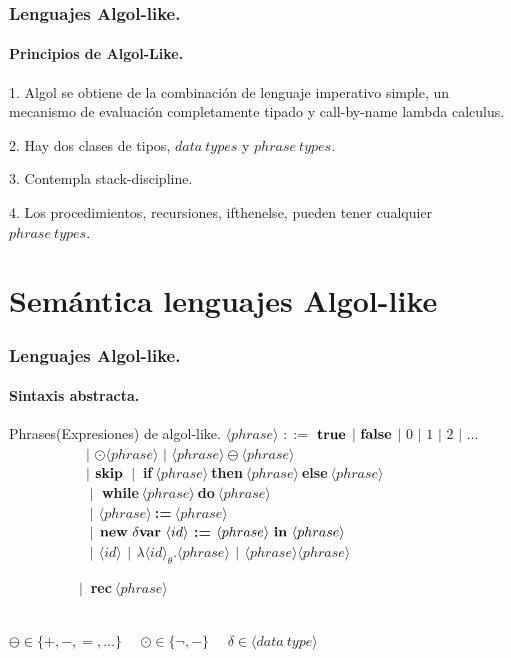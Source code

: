 \documentclass{beamer} %
\newcommand{\angles}[1]{\langle #1 \rangle}
\newcommand{\deltavar}{\delta \bf{var}}
\newcommand{\cskip}{$\bf{skip}$}
\newcommand{\ifthenelse}[3]{\ $\bf{if}$ \ #1 \ $\bf{then}$ \ #2 \ $\bf{else}$ \ #3}
\newcommand{\whiledo}[2]{\ $\bf{while}$ \ #1 \ $\bf{do}$ \ #2}
\newcommand{\rec}[1]{\ $\bf{rec}$ \ #1}
\newcommand{\clambda}[3]{\lambda #1_{#2} . #3}
\newcommand{\assig}[2]{#1 \ ${\bf :=}$ \ #2}
\newcommand{\newdeltavar}[3]{{\bf new \ \deltavar} \ #1 \ ${\bf :=}$ \ #2 \ {\bf in} \ #3}
\begin{document}
\begin{frame}
\frametitle{Lenguajes Algol-like.}
\framesubtitle{Principios de Algol-Like.}
\begin{block}{}
1. Algol se obtiene de la combinaci\'on de lenguaje imperativo simple, un mecanismo de evaluaci\'on completamente tipado y
call-by-name lambda calculus.\\
\end{block}
\begin{block}{}
2. Hay dos clases de tipos, $data \ types$ y $phrase \ types$.\\
\end{block}
\begin{block}{}
3. Contempla stack-discipline.\\
\end{block}
\begin{block}{}
4. Los procedimientos, recursiones, ifthenelse, pueden tener cualquier $phrase \ types$.
\end{block}
\end{frame}

\section{Sem\'antica lenguajes Algol-like}
\begin{frame}
\frametitle{Lenguajes Algol-like.}
\framesubtitle{Sintaxis abstracta.}

\begin{block}{Phrases(Expresiones) de algol-like.}
$\angles{phrase}$ $::=$ $\bf{true}$ $|$ $\bf{false}$ $|$ $0$ $|$ $1$ $|$ $2$ $|$ $\ldots$\\

\ \ \ \ \ \ \ \ \ \ \ $|$ $\odot \angles{phrase}$ $|$ $\angles{phrase} \ominus \angles{phrase}$\\

\ \ \ \ \ \ \ \ \ \ \ $|$ \cskip \ $|$ $\ifthenelse{\angles{phrase}}{\angles{phrase}}{\angles{phrase}}$\\

\ \ \ \ \ \ \ \ \ \ $|$ $\whiledo{\angles{phrase}}{\angles{phrase}}$\\

\ \ \ \ \ \ \ \ \ \ $|$ $\assig{\angles{phrase}}{\angles{phrase}}$\\

\ \ \ \ \ \ \ \ \ \ $|$ $\newdeltavar{\angles{id}}{\angles{phrase}}{\angles{phrase}}$\\

\ \ \ \ \ \ \ \ \ \ $|$ $\angles{id}$ $|$ $\clambda{\angles{id}}{\theta}{\angles{phrase}}$ $|$ $\angles{phrase}\angles{phrase}$ 

\ \ \ \ \ \ \ \ \ \ $|$ $\rec{\angles{phrase}}$\\

\

$\ominus \in \{+, -, =, ...\}$ \ \
$\odot \in \{ \neg , - \}$ \ \
$\delta \in \angles{data \ type}$
\end{block}
\end{frame}
\end{document}
